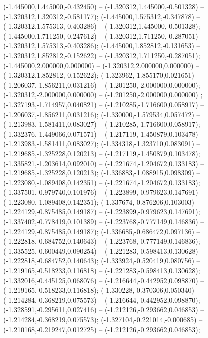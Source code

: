  (-1.445000,1.445000,-0.432450) -- (-1.320312,1.445000,-0.501328) -- (-1.320312,1.320312,-0.581177);
 (-1.445000,1.575312,-0.347878) -- (-1.320312,1.575313,-0.403286) -- (-1.320312,1.445000,-0.501328);
 (-1.445000,1.711250,-0.247612) -- (-1.320312,1.711250,-0.287051) -- (-1.320312,1.575313,-0.403286);
 (-1.445000,1.852812,-0.131653) -- (-1.320312,1.852812,-0.152622) -- (-1.320312,1.711250,-0.287051);
 (-1.445000,2.000000,0.000000) -- (-1.320312,2.000000,0.000000) -- (-1.320312,1.852812,-0.152622);
 (-1.323962,-1.855170,0.021651) -- (-1.206037,-1.856211,0.031216) -- (-1.201250,-2.000000,0.000000);
 (-1.320312,-2.000000,0.000000) -- (-1.201250,-2.000000,0.000000) ;
 (-1.327193,-1.714957,0.040821) -- (-1.210285,-1.716600,0.058917) -- (-1.206037,-1.856211,0.031216);
 (-1.330000,-1.579534,0.057472) -- (-1.213983,-1.581411,0.083027) -- (-1.210285,-1.716600,0.058917);
 (-1.332376,-1.449066,0.071571) -- (-1.217119,-1.450879,0.103478) -- (-1.213983,-1.581411,0.083027);
 (-1.334318,-1.323710,0.083091) -- (-1.219685,-1.325228,0.120213) -- (-1.217119,-1.450879,0.103478);
 (-1.335821,-1.203614,0.092010) -- (-1.221674,-1.204672,0.133183) -- (-1.219685,-1.325228,0.120213);
 (-1.336883,-1.088915,0.098309) -- (-1.223080,-1.089408,0.142351) -- (-1.221674,-1.204672,0.133183);
 (-1.337501,-0.979740,0.101976) -- (-1.223899,-0.979623,0.147691) -- (-1.223080,-1.089408,0.142351);
 (-1.337674,-0.876206,0.103003) -- (-1.224129,-0.875485,0.149187) -- (-1.223899,-0.979623,0.147691);
 (-1.337402,-0.778419,0.101389) -- (-1.223768,-0.777149,0.146836) -- (-1.224129,-0.875485,0.149187);
 (-1.336685,-0.686472,0.097136) -- (-1.222818,-0.684752,0.140643) -- (-1.223768,-0.777149,0.146836);
 (-1.335525,-0.600449,0.090254) -- (-1.221283,-0.598413,0.130628) -- (-1.222818,-0.684752,0.140643);
 (-1.333924,-0.520419,0.080756) -- (-1.219165,-0.518233,0.116818) -- (-1.221283,-0.598413,0.130628);
 (-1.332016,-0.445125,0.068076) -- (-1.216644,-0.442952,0.098870) -- (-1.219165,-0.518233,0.116818);
 (-1.330228,-0.370306,0.050340) -- (-1.214284,-0.368219,0.075573) -- (-1.216644,-0.442952,0.098870);
 (-1.328591,-0.295611,0.027416) -- (-1.212126,-0.293662,0.046853) -- (-1.214284,-0.368219,0.075573);
 (-1.327104,-0.221014,-0.000685) -- (-1.210168,-0.219247,0.012725) -- (-1.212126,-0.293662,0.046853);
